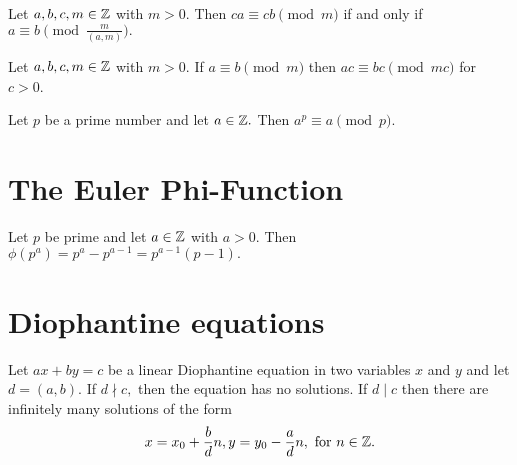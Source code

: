 \documentclass[letterpaper, 11 pt]{ximera}
\begin{document}
\begin{prop*}[Proposition 2.5]\label{prop:equiv-gcd}
    Let $a,b,c,m\in\mathbb Z$ with $m>0.$ Then $ca\equiv cb\pmod{m}$ if and only if $a\equiv b\pmod{\tfrac{m}{(a,m)}}.$
\end{prop*}


\begin{lem*}\label{ex-equiv-upmod}
    Let $a,b,c,m\in\mathbb Z$ with $m>0.$ If $a\equiv b \pmod{m}$ then $ac\equiv bc \pmod{mc}$ for $c>0$.
\end{lem*}


\begin{cor*}[Corollary 2.15]\label{cor:a_power_prime_mod}
    Let $p$ be a prime number and let $a\in\mathbb Z.$ Then $a^p\equiv a\pmod{p}.$
\end{cor*}

\section*{The Euler Phi-Function}

\begin{thm*}[Theorem 3.3]\label{thm:phi-prime-power}
    Let $p$ be prime and let $a\in\mathbb Z$ with $a>0.$ Then $\phi(p^a)=p^a-p^{a-1}=p^{a-1}(p-1).$
\end{thm*}
\section*{Diophantine equations}
\begin{thm*}[Theorem 6.2]\label{thm:linear-dioph}
Let $ax+by=c$ be a linear Diophantine equation in two variables $x$ and $y$ and let $d=(a,b).$ If $d\nmid c,$ then the equation has no solutions. If $d\mid c$ then there are infinitely many solutions of the form \[
            x=x_0+\frac{b}{d}n, y=y_0-\frac{a}{d}n, \text{ for } n\in\mathbb Z.
        \]
\end{thm*}
\end{document}
